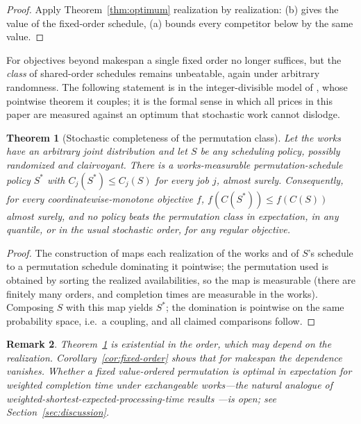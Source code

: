 \documentclass[sn-mathphys,NameDate]{sn-jnl}
\theoremstyle{thmstyleone}
\newtheorem{theorem}{Theorem}
\theoremstyle{thmstylethree}
\theoremstyle{thmstyletwo}
\newtheorem{remark}[theorem]{Remark}
\begin{document}
\begin{proof}
Apply Theorem~\ref{thm:optimum} realization by realization: (b)
gives the value of the fixed-order schedule, (a) bounds every
competitor below by the same value.
\end{proof}

For objectives beyond makespan a single fixed order no longer
suffices, but the \emph{class} of shared-order schedules remains
unbeatable, again under arbitrary randomness. The following
statement is in the integer-divisible model of \citet{bowmanA},
whose pointwise theorem it couples; it is the formal sense in which
all prices in this paper are measured against an optimum that
stochastic work cannot dislodge.

\begin{theorem}[Stochastic completeness of the permutation class]
\label{thm:completeness}
Let the works have an arbitrary joint distribution and let $S$ be
any scheduling policy, possibly randomized and clairvoyant. There
is a works-measurable permutation-schedule policy $S^*$ with
$C_j(S^*) \le C_j(S)$ for every job $j$, almost surely.
Consequently, for every coordinatewise-monotone objective $f$,
$f(C(S^*)) \le f(C(S))$ almost surely, and no policy beats the
permutation class in expectation, in any quantile, or in the usual
stochastic order, for any regular objective.
\end{theorem}

\begin{proof}
The construction of \citet{bowmanA} maps each realization of the
works and of $S$'s schedule to a permutation schedule dominating it
pointwise; the permutation used is obtained by sorting the
realized availabilities, so the map is measurable (there are
finitely many orders, and completion times are measurable in the
works). Composing $S$ with this map yields $S^*$; the domination is
pointwise on the same probability space, i.e.\ a coupling, and all
claimed comparisons follow.
\end{proof}

\begin{remark}
Theorem~\ref{thm:completeness} is existential in the order, which
may depend on the realization. Corollary~\ref{cor:fixed-order} shows
that for makespan the dependence vanishes. Whether a fixed
\emph{value-ordered} permutation is optimal in expectation for
weighted completion time under exchangeable works---the natural
analogue of weighted-shortest-expected-processing-time results
\citep{rothkopf1966}---is open; see Section~\ref{sec:discussion}.
\end{remark}
\end{document}
